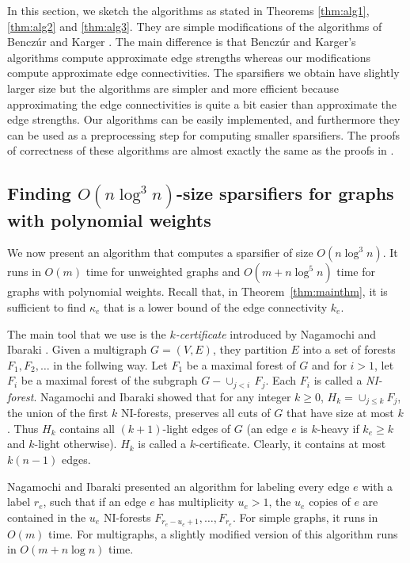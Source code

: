 \documentclass[11pt]{article}
\numberwithin{equation}{section}
\newcommand{\Theorem}[1]{Theorem~\ref{thm:#1}}
\begin{document}
In this section,
we sketch the algorithms as stated in Theorems \ref{thm:alg1}, \ref{thm:alg2} and \ref{thm:alg3}.
They are simple modifications of the algorithms of Bencz\'ur and Karger \cite{BK}.
The main difference is that Bencz\'ur and Karger's algorithms compute approximate edge strengths
whereas our modifications compute approximate edge connectivities.
The sparsifiers we obtain have slightly larger size but the algorithms are simpler and more efficient
because approximating the edge connectivities is quite a bit easier
than approximate the edge strengths.
Our algorithms can be easily implemented, and furthermore they can be used as a preprocessing step
for computing smaller sparsifiers.
The proofs of correctness of these algorithms are almost exactly the
same as the proofs in \cite{BK}.


\subsection{Finding $O(n\log^3 n)$-size sparsifiers for graphs with polynomial weights}

We now present an algorithm that computes a sparsifier of size $O(n\log^3 n)$.
It runs in $O(m)$ time for unweighted graphs and 
$O(m+n\log^5n)$ time for graphs with polynomial weights.
Recall that, in \Theorem{mainthm},
it is sufficient to find $\kappa_e$ 
that is a lower bound of the edge connectivity $k_e$.

The main tool that we use is the \emph{$k$-certificate}
introduced by Nagamochi and Ibaraki \cite{NIForest1}.
Given a multigraph $G=(V,E)$, they partition $E$ into a set of forests
$F_1,F_2,\ldots$ in the follwing way.
Let $F_1$ be a maximal forest of $G$
and for $i>1$, let $F_i$ be a maximal forest of the subgraph $G-\cup_{j<i} \, F_j$.
Each $F_i$ is called a \emph{NI-forest}.
Nagamochi and Ibaraki showed that for any integer $k\ge 0$,
$H_k=\cup_{j\le k} F_j$,
the union of the first $k$ NI-forests, preserves all cuts of $G$
that have size at most $k$.
Thus $H_k$ contains all $(k+1)$-light edges of $G$
(an edge $e$ is $k$-heavy if $k_e\ge k$ and $k$-light otherwise).
$H_k$ is called a $k$-certificate.
Clearly, it contains at most $k(n-1)$ edges.

Nagamochi and Ibaraki \cite{NIForest1} presented an algorithm for labeling 
every edge $e$ with a label $r_e$,
such that if an edge $e$ has multiplicity $u_e>1$, the $u_e$ copies of $e$
are contained in the $u_e$ NI-forests $F_{r_e-u_e+1},\ldots,F_{r_e}$.
For simple graphs, it runs in $O(m)$ time.
For multigraphs, a slightly modified version \cite{NIForest2} of this algorithm runs in
$O(m+n\log n)$ time.
\end{document}
